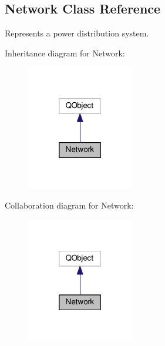 \hypertarget{class_network}{}\subsection{Network Class Reference}
\label{class_network}


Represents a power distribution system.  




Inheritance diagram for Network\+:
\nopagebreak
\begin{figure}[H]
\begin{center}
\leavevmode
\includegraphics[width=133pt]{class_network__inherit__graph}
\end{center}
\end{figure}


Collaboration diagram for Network\+:
\nopagebreak
\begin{figure}[H]
\begin{center}
\leavevmode
\includegraphics[width=133pt]{class_network__coll__graph}
\end{center}
\end{figure}
